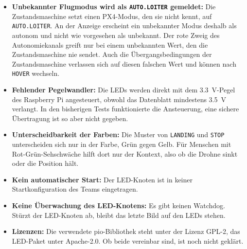     \begin{itemize}
        \item \textbf{Unbekannter Flugmodus wird als \texttt{AUTO.LOITER} gemeldet:} Die Zustandsmaschine setzt einen PX4-Modus, den sie nicht kennt, auf \texttt{AUTO.LOITER}. An der Anzeige erscheint ein unbekannter Modus deshalb als autonom und nicht wie vorgesehen als unbekannt. Der rote Zweig des Autonomiekanals greift nur bei einem unbekannten Wert, den die Zustandsmaschine nie sendet. Auch die Übergangsbedingungen der Zustandsmaschine verlassen sich auf diesen falschen Wert und können nach \texttt{HOVER} wechseln.
        \item \textbf{Fehlender Pegelwandler:} Die LEDs werden direkt mit dem \SI{3,3}{\volt}-Pegel des Raspberry Pi angesteuert, obwohl das Datenblatt mindestens \SI{3,5}{\volt} verlangt. In den bisherigen Tests funktionierte die Ansteuerung, eine sichere Übertragung ist so aber nicht gegeben.
        \item \textbf{Unterscheidbarkeit der Farben:} Die Muster von \texttt{LANDING} und \texttt{STOP} unterscheiden sich nur in der Farbe, Grün gegen Gelb. Für Menschen mit Rot-Grün-Sehschwäche hilft dort nur der Kontext, also ob die Drohne sinkt oder die Position hält.
        \item \textbf{Kein automatischer Start:} Der LED-Knoten ist in keiner Startkonfiguration des Teams eingetragen.
        \item \textbf{Keine Überwachung des LED-Knotens:} Es gibt keinen Watchdog. Stürzt der LED-Knoten ab, bleibt das letzte Bild auf den LEDs stehen.
        \item \textbf{Lizenzen:} Die verwendete \gls{pio}-Bibliothek steht unter der Lizenz GPL-2, das LED-Paket unter Apache-2.0. Ob beide vereinbar sind, ist noch nicht geklärt.
    \end{itemize}
